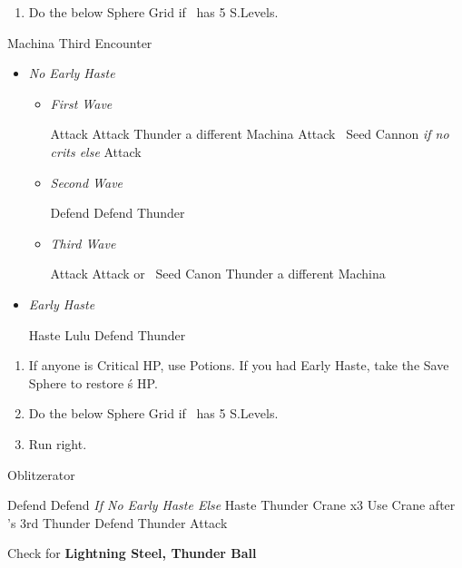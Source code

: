 \begin{enumerate}[resume]
    \item Do the below Sphere Grid if \tidus\ has 5 S.Levels.
\end{enumerate}
\begin{battle}{Machina Third Encounter}
        \begin{itemize}
        \item \textit{No Early Haste}
        \begin{itemize}
            \item \textit{First Wave}
            \begin{itemize}
                \tidusf Attack
                \kimahrif Attack
                \luluf Thunder a different Machina
                \tidusf Attack
                \kimahrif \od\ Seed Cannon \textit{if no crits else} Attack
            \end{itemize}
            \item \textit{Second Wave}
            \begin{itemize}
                \tidusf Defend
                \kimahrif Defend
                \luluf Thunder
            \end{itemize}
            \item \textit{Third Wave}
            \begin{itemize}
                \tidusf Attack
                \kimahrif Attack or \od\ Seed Canon
                \luluf Thunder a different Machina
            \end{itemize}
        \end{itemize}
        \item \textit{Early Haste}
        \begin{itemize}
        \tidusf Haste Lulu
        \kimahrif Defend
        \luluf Thunder
        \end{itemize}
    \end{itemize}
\end{battle}
\begin{enumerate}[resume]
    \item If anyone is Critical HP, use Potions. If you had Early Haste, take the Save Sphere to restore \tidus\'s HP.
    \item Do the below Sphere Grid if \tidus\ has 5 S.Levels.
    \item Run right.
\end{enumerate}
\begin{battle}[3000]{Oblitzerator}
    \begin{itemize}
        \kimahrif Defend
        \tidusf Defend \textit{If No Early Haste Else} Haste \lulu
        \luluf Thunder Crane x3
        \tidusf Use Crane after \lulu's 3rd Thunder
        \kimahrif Defend
        \luluf Thunder
        \tidusf Attack
    \end{itemize}
    Check for \textbf{Lightning Steel, Thunder Ball}
\end{battle}
